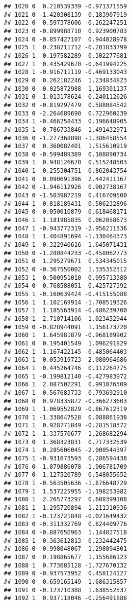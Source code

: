 \documentclass[
]{article}
\begin{document}
\begin{verbatim}
## 1020 0  0.210539339 -0.971371559
## 1021 0 -1.420308139 -0.183907919
## 1022 0  0.597378606 -0.262247251
## 1023 0 -0.899988710  0.923900783
## 1024 0 -0.857427107  0.944028978
## 1025 1  0.238711712 -0.201833799
## 1026 1 -0.197582289  0.302277681
## 1027 1  0.435429670 -0.641994225
## 1028 1 -0.916711119 -0.469133043
## 1029 0  0.262182246  1.234834823
## 1030 0 -0.025872988  1.169301137
## 1031 0 -1.013178624 -0.240112626
## 1032 0 -0.819297479  0.588084542
## 1033 0 -2.264689690  0.722960239
## 1034 1 -0.466258433  0.196648905
## 1035 1  0.786733846 -1.491432971
## 1036 0 -1.277368898 -1.386458554
## 1037 0  0.360082401  1.515610919
## 1038 0 -0.599489389  0.108890734
## 1039 1  0.948126670  0.515248503
## 1040 1  0.255304751  0.862043754
## 1041 0  0.090691396  2.442411167
## 1042 0 -1.946112926  0.902738167
## 1043 0 -1.503987219  0.416709500
## 1044 1 -0.818189431 -0.506232896
## 1045 0  0.050010879 -0.618468171
## 1046 1  1.181985835  0.062058673
## 1047 1 -0.943772319 -2.956211536
## 1048 1  1.404891694 -1.130464373
## 1049 1  0.322940616  1.645071431
## 1050 0 -1.280844233 -0.458062773
## 1051 0  1.295279671  0.534345015
## 1052 0 -0.367550002  1.335352312
## 1053 1  0.500951010  0.995713380
## 1054 0  0.768588051  0.425727392
## 1055 1 -0.160639424 -0.415155088
## 1056 1  1.102169914 -1.708519326
## 1057 1  1.185563914 -0.486239700
## 1058 1  2.710714106 -1.023452944
## 1059 0 -0.828944091  1.156173720
## 1060 1  1.645981879 -0.968189902
## 1061 0  0.195401549  1.096291829
## 1062 1 -1.167422145 -0.485064403
## 1063 1 -0.053919723 -2.080964686
## 1064 1  0.445264746  0.112264775
## 1065 1 -0.199812140 -0.427983972
## 1066 1  2.087502291  0.991076509
## 1067 1  0.567683733  0.793692910
## 1068 0  0.978335872 -0.366273603
## 1069 1  1.069552829 -0.867612319
## 1070 1 -1.338647528  0.088861938
## 1071 1  0.928771849 -0.281518372
## 1072 1  1.337570677  1.268682294
## 1073 0  1.368323831  0.717332539
## 1074 1  0.285606045 -2.000544397
## 1075 1 -0.931673593  0.286594438
## 1076 0 -1.879886078 -1.906781709
## 1077 0 -1.127520789 -0.548055652
## 1078 1 -0.563505636 -1.876648729
## 1079 1  1.537225955 -1.198253982
## 1080 1  2.265773297  0.608399108
## 1081 1 -1.295720894 -1.211310936
## 1082 1 -0.123721848 -0.021649432
## 1083 0 -0.311332769  0.824409776
## 1084 0 -0.887650963  1.144827518
## 1085 1  0.363612813  0.232442475
## 1086 0 -0.998048067  1.298094801
## 1087 0  0.198865677  1.155686123
## 1088 1  0.773685128 -1.727670132
## 1089 0 -0.937573952  0.458124127
## 1090 0  0.659165149  1.686315857
## 1091 0 -0.123710388  1.638552537
## 1092 1  0.937118046 -0.256491886

\end{verbatim}
\end{document}
